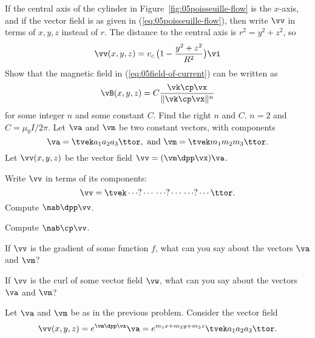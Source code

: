 \begin{multicols}{2}
\problem If the central axis of the cylinder in 
Figure~\ref{fig:05poisseuille-flow} is the $x$-axis, and if the vector
field is as given in (\ref{eq:05poisseuille-flow}), then write $\vv$ in
terms of $x, y, z$ instead of $r$.
\answer The distance to the central axis is $r^2 = y^2+z^2$, so
\[
\vv(x, y, z) = v_c\, \bigl(1-\frac{y^2+z^2} {R^2}\bigr)\vi
\]
\endanswer
\problem Show that the magnetic field in (\ref{eq:05field-of-current}) can 
be written as
\[
\vB(x, y, z) = C \frac{\vk\cp\vx} {\|\vk\cp\vx\|^n}
\]
for some integer $n$ and some constant $C$.   Find the right $n$ and $C$.
\answer
$n=2$ and $C=\mu_0 I/2\pi$.
\endanswer
\problem \label{prb:05derivs-of-a-times-m-dot-x} 
Let $\va$ and $\vm$ be two constant vectors, with components
\[
\va = \tvek a_1\\a_2\\a_3\ttor, \text{ and }
\vm = \tvek m_1\\m_2\\m_3\ttor.
\]
Let $\vv(x, y, z)$ be the vector field $\vv = (\vm\dpp\vx)\va$.

\subprob Write $\vv$ in terms of its components:
\[
\vv = \tvek \cdots?\cdots \\ \cdots?\cdots \\ \cdots?\cdots \ttor.
\]
\subprob Compute $\nab\dpp \vv$.  

\subprob Compute $\nab \cp \vv$.  

\subprob If $\vv$ is the gradient of some function $f$, 
what can you say about the vectors $\va$ and $\vm$?

\subprob If $\vv$ is the curl of some vector field $\vw$, 
what can you say about the vectors $\va$ and $\vm$?

\problem \label{prb:05derivs-of-a-exp-of-mx} 
Let $\va$ and $\vm$ be as in the previous problem.
Consider the vector field
\[
\vv(x, y, z) = e^{\vm\dpp\vx}\va = e^{m_1x+m_2y+m_3z}\tvek a_1\\a_2\\a_3\ttor.
\]


\end{multicols}
